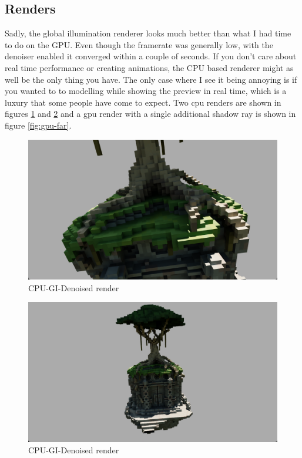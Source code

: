 \subsection*{Renders}
Sadly, the global illumination renderer looks much better than what I had time to do on the GPU. Even though the framerate was generally low, with the denoiser enabled it converged within a couple of seconds. If you don't care about real time performance or creating animations, the CPU based renderer might as well be the only thing you have. The only case where I see it being annoying is if you wanted to to modelling while showing the preview in real time, which is a luxury that some people have come to expect. Two cpu renders are shown in figures \ref{fig:cpu-close} and \ref{fig:cpu-far} and a gpu render with a single additional shadow ray is shown in figure \ref{fig:gpu-far}.
\begin{figure}
	\centering
	\includegraphics[width=1\linewidth]{Cpu-close}
	\caption{CPU-GI-Denoised render}
	\label{fig:cpu-close}
\end{figure}
\begin{figure}
	\centering
	\includegraphics[width=1\linewidth]{cpu-far}
	\caption{CPU-GI-Denoised render}
	\label{fig:cpu-far}
\end{figure}

